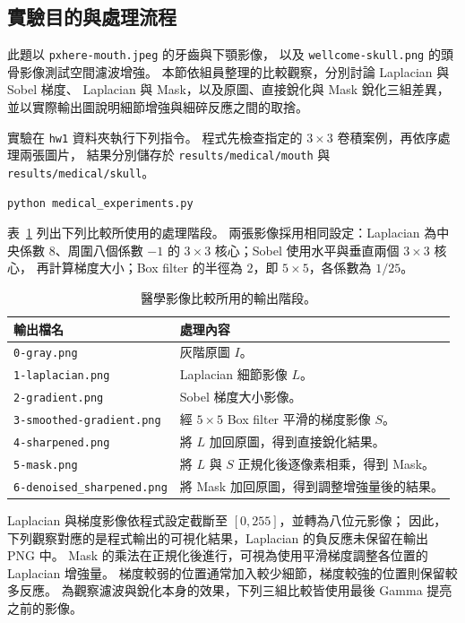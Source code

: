 \subsection{實驗目的與處理流程}

此題以 \texttt{pxhere-mouth.jpeg} 的牙齒與下顎影像，
以及 \texttt{wellcome-skull.png} 的頭骨影像測試空間濾波增強。
本節依組員整理的比較觀察，分別討論 Laplacian 與 Sobel 梯度、
Laplacian 與 Mask，以及原圖、直接銳化與 Mask 銳化三組差異，
並以實際輸出圖說明細節增強與細碎反應之間的取捨。

實驗在 \texttt{hw1} 資料夾執行下列指令。
程式先檢查指定的 $3\times3$ 卷積案例，再依序處理兩張圖片，
結果分別儲存於 \texttt{results/medical/mouth} 與
\texttt{results/medical/skull}。

\begin{lstlisting}[language={},caption={醫學影像增強實驗的執行指令}]
python medical_experiments.py
\end{lstlisting}

表~\ref{tab:medical-stages} 列出下列比較所使用的處理階段。
兩張影像採用相同設定：Laplacian 為中央係數 $8$、周圍八個係數 $-1$ 的
$3\times3$ 核心；Sobel 使用水平與垂直兩個 $3\times3$ 核心，
再計算梯度大小；Box filter 的半徑為 $2$，即 $5\times5$，各係數為 $1/25$。

\begin{table}[H]
  \centering
  \caption{醫學影像比較所用的輸出階段。}
  \label{tab:medical-stages}
  \begin{tabularx}{\textwidth}{@{}lX@{}}
    \toprule
    輸出檔名 & 處理內容 \\
    \midrule
    \texttt{0-gray.png} & 灰階原圖 $I$。 \\
    \texttt{1-laplacian.png} & Laplacian 細節影像 $L$。 \\
    \texttt{2-gradient.png} & Sobel 梯度大小影像。 \\
    \texttt{3-smoothed-gradient.png} & 經 $5\times5$ Box filter 平滑的梯度影像 $S$。 \\
    \texttt{4-sharpened.png} & 將 $L$ 加回原圖，得到直接銳化結果。 \\
    \texttt{5-mask.png} & 將 $L$ 與 $S$ 正規化後逐像素相乘，得到 Mask。 \\
    \texttt{6-denoised\_sharpened.png} & 將 Mask 加回原圖，得到調整增強量後的結果。 \\
    \bottomrule
  \end{tabularx}
\end{table}

Laplacian 與梯度影像依程式設定截斷至 $[0,255]$，並轉為八位元影像；
因此，下列觀察對應的是程式輸出的可視化結果，Laplacian 的負反應未保留在輸出 PNG 中。
Mask 的乘法在正規化後進行，可視為使用平滑梯度調整各位置的 Laplacian 增強量。
梯度較弱的位置通常加入較少細節，梯度較強的位置則保留較多反應。
為觀察濾波與銳化本身的效果，下列三組比較皆使用最後 Gamma 提亮之前的影像。

